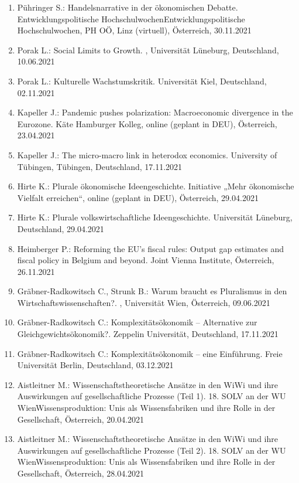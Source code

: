 \begin{enumerate}
	\item Pühringer S.: Handelsnarrative in der ökonomischen Debatte. Entwicklungspolitische HochschulwochenEntwicklungspolitische Hochschulwochen, PH OÖ, Linz (virtuell), Österreich, 30.11.2021
	\item Porak L.: Social Limits to Growth. , Universität Lüneburg, Deutschland, 10.06.2021
	\item Porak L.: Kulturelle Wachstumskritik. Universität Kiel, Deutschland, 02.11.2021
	\item Kapeller J.: Pandemic pushes polarization: Macroeconomic divergence in the Eurozone. Käte Hamburger Kolleg, online (geplant in DEU), Österreich, 23.04.2021
	\item Kapeller J.: The micro-macro link in heterodox economics. University of Tübingen, Tübingen, Deutschland, 17.11.2021
	\item Hirte K.: Plurale ökonomische Ideengeschichte. Initiative „Mehr ökonomische Vielfalt erreichen“, online (geplant in DEU), Österreich, 29.04.2021
	\item Hirte K.: Plurale volkswirtschaftliche Ideengeschichte. Universität Lüneburg, Deutschland, 29.04.2021
	\item Heimberger P.: Reforming the EU’s fiscal rules: Output gap estimates and fiscal policy in Belgium and beyond. Joint Vienna Institute, Österreich, 26.11.2021
	\item Gräbner-Radkowitsch C., Strunk B.: Warum braucht es Pluralismus in den Wirtschaftswissenschaften?. , Universität Wien, Österreich, 09.06.2021
	\item Gräbner-Radkowitsch C.: Komplexitätsökonomik – Alternative zur Gleichgewichtsökonomik?. Zeppelin Universität, Deutschland, 17.11.2021
	\item Gräbner-Radkowitsch C.: Komplexitätsökonomik – eine Einführung. Freie Universität Berlin, Deutschland, 03.12.2021
	\item Aistleitner M.: Wissenschaftstheoretische Ansätze in den WiWi und ihre Auswirkungen auf gesellschaftliche Prozesse (Teil 1). 18. SOLV an der WU WienWissensproduktion: Unis als Wissensfabriken und ihre Rolle in der Gesellschaft, Österreich, 20.04.2021
	\item Aistleitner M.: Wissenschaftstheoretische Ansätze in den WiWi und ihre Auswirkungen auf gesellschaftliche Prozesse (Teil 2). 18. SOLV an der WU WienWissensproduktion: Unis als Wissensfabriken und ihre Rolle in der Gesellschaft, Österreich, 28.04.2021
\end{enumerate}
